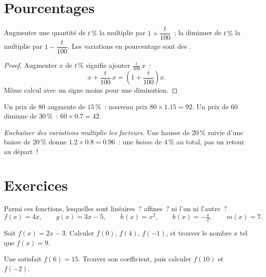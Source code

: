 \section{Pourcentages}

\begin{proposition}\label{prop:g9:linfunc:percent}
Augmenter une quantité de $t\,\%$ la multiplie par
$1 + \dfrac{t}{100}$~; la diminuer de $t\,\%$ la multiplie par
$1 - \dfrac{t}{100}$. Les variations en pourcentage sont des .
\end{proposition}

\begin{proof}
Augmenter $x$ de $t\,\%$ signifie ajouter $\frac{t}{100}\,x$~:
\[
x + \frac{t}{100}\,x = \left(1 + \frac{t}{100}\right) x .
\]
Même calcul avec un signe moins pour une diminution.
\end{proof}

\begin{example}\label{ex:g9:linfunc:percent}
Un prix de $80$ augmente de $15\,\%$~: nouveau prix
$80 \times 1.15 = 92$. Un prix de $60$ diminue de $30\,\%$~:
$60 \times 0.7 = 42$.

\emph{Enchaîner des variations multiplie les facteurs.} Une hausse de
$20\,\%$ suivie d'une baisse de $20\,\%$ donne
$1.2 \times 0.8 = 0.96$~: une \emph{baisse} de $4\,\%$ au total, pas un
retour au départ~!
\end{example}

\section{Exercices}

\begin{exercise}[$\star$]\label{exo:g9:linfunc:1}
Parmi ces fonctions, lesquelles sont linéaires~? affines~? ni l'un ni
l'autre~?
\[
f(x) = 4x, \qquad
g(x) = 3x - 5, \qquad
h(x) = x^2, \qquad
k(x) = -\tfrac x2, \qquad
m(x) = 7 .
\]
\end{exercise}

\begin{exercise}[$\star$]\label{exo:g9:linfunc:2}
Soit $f(x) = 2x - 3$. Calculer $f(0)$, $f(4)$, $f(-1)$, et trouver le
nombre $x$ tel que $f(x) = 9$.
\end{exercise}

\begin{exercise}[$\star$]\label{exo:g9:linfunc:3}
Une  satisfait $f(6) = 15$. Trouver son coefficient,
puis calculer $f(10)$ et $f(-2)$.
\end{exercise}

